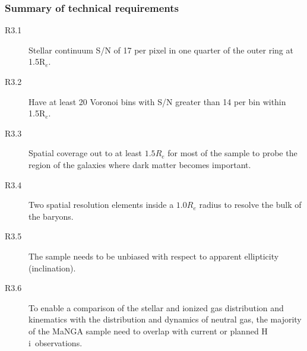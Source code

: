 \documentclass[preprint,11pt]{aastex}
\newcommand{\Reff}{{R$_{e}$}}
\newcommand{\HI}{{\sc H\,i}}
\begin{document}
\subsubsection{Summary of technical requirements}


\begin{description}

\item [R3.1] Stellar continuum S/N of 17 per pixel in one quarter of
  the outer ring at 1.5\Reff.

\item [R3.2] Have at least 20 Voronoi bins with S/N greater than 14
  per bin within 1.5\Reff.

\item [R3.3] Spatial coverage out to at least $1.5R_e$ for most of the
  sample to probe the region of the galaxies where dark matter becomes
  important.

\item [R3.4] Two spatial resolution elements inside a $1.0R_e$ radius
  to resolve the bulk of the baryons.

\item [R3.5] The sample needs to be unbiased with respect to apparent ellipticity (inclination).

\item [R3.6] To enable a comparison of the stellar and ionized gas distribution and kinematics with the distribution and dynamics of neutral gas, the majority of the MaNGA sample need to overlap with current or planned \HI\ observations. 
\end{description}

\end{document}
